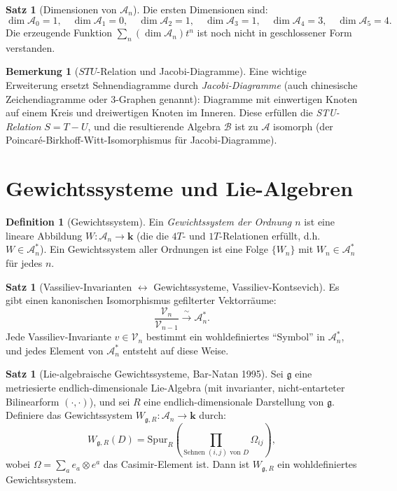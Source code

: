 \documentclass[12pt,a4paper]{amsart}
\theoremstyle{definition}
\newtheorem{satz}[theorem]{Satz}
\newtheorem{bemerkung}[theorem]{Bemerkung}
\newtheorem{definition_de}[theorem]{Definition}
\newcommand{\Ac}{\mathcal{A}}
\begin{document}
\begin{satz}[Dimensionen von $\mathcal{A}_n$]
Die ersten Dimensionen sind:
\[
  \dim \Ac_0 = 1, \quad \dim \Ac_1 = 0, \quad \dim \Ac_2 = 1,
  \quad \dim \Ac_3 = 1, \quad \dim \Ac_4 = 3, \quad \dim \Ac_5 = 4.
\]
Die erzeugende Funktion $\sum_n (\dim \Ac_n) t^n$ ist noch nicht in
geschlossener Form verstanden.
\end{satz}

\begin{bemerkung}[$STU$-Relation und Jacobi-Diagramme]
Eine wichtige Erweiterung ersetzt Sehnendiagramme durch \emph{Jacobi-Diagramme}
(auch chinesische Zeichendiagramme oder $3$-Graphen genannt): Diagramme mit
einwertigen Knoten auf einem Kreis und dreiwertigen Knoten im Inneren.
Diese erfüllen die \emph{STU-Relation} $S = T - U$, und die resultierende
Algebra $\mathcal{B}$ ist zu $\Ac$ isomorph (der Poincaré-Birkhoff-Witt-Isomorphismus
für Jacobi-Diagramme).
\end{bemerkung}

\section{Gewichtssysteme und Lie-Algebren}\label{sec:gewicht}

\begin{definition_de}[Gewichtssystem]
Ein \emph{Gewichtssystem der Ordnung $n$} ist eine lineare Abbildung
$W: \Ac_n \to \mathbf{k}$ (die die $4T$- und $1T$-Relationen erfüllt,
d.h.\ $W \in \Ac_n^*$).  Ein Gewichtssystem aller Ordnungen ist eine
Folge $\{W_n\}$ mit $W_n \in \Ac_n^*$ für jedes $n$.
\end{definition_de}

\begin{satz}[Vassiliev-Invarianten $\leftrightarrow$ Gewichtssysteme,
Vassiliev-Kontsevich]\label{satz:vs_ws}
Es gibt einen kanonischen Isomorphismus gefilterter Vektorräume:
\[
  \frac{\mathcal{V}_n}{\mathcal{V}_{n-1}} \xrightarrow{\;\sim\;} \Ac_n^*.
\]
Jede Vassiliev-Invariante $v \in \mathcal{V}_n$ bestimmt ein wohldefiniertes
``Symbol'' in $\Ac_n^*$, und jedes Element von $\Ac_n^*$ entsteht auf
diese Weise.
\end{satz}

\begin{satz}[Lie-algebraische Gewichtssysteme, Bar-Natan 1995]
\label{satz:lie_ws}
Sei $\mathfrak{g}$ eine metriesierte endlich-dimensionale Lie-Algebra
(mit invarianter, nicht-entarteter Bilinearform $(\cdot,\cdot)$), und
sei $R$ eine endlich-dimensionale Darstellung von $\mathfrak{g}$.
Definiere das Gewichtssystem
$W_{\mathfrak{g},R}: \Ac_n \to \mathbf{k}$ durch:
\[
  W_{\mathfrak{g},R}(D) = \mathrm{Spur}_R\!\left(\prod_{\text{Sehnen } (i,j) \text{ von } D}
  \Omega_{ij}\right),
\]
wobei $\Omega = \sum_a e_a \otimes e^a$ das Casimir-Element ist.
Dann ist $W_{\mathfrak{g},R}$ ein wohldefiniertes Gewichtssystem.
\end{satz}
\end{document}
